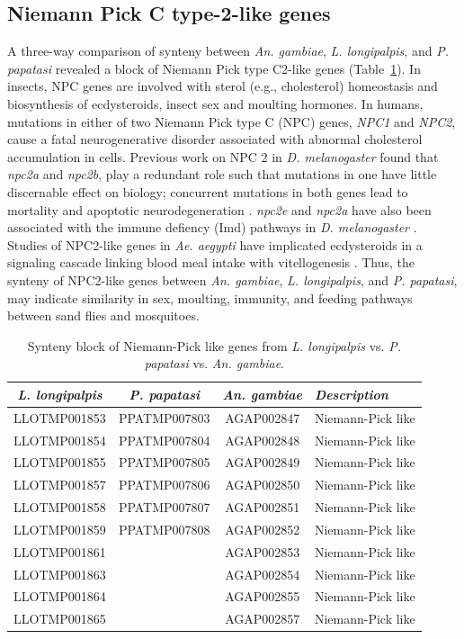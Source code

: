 \subsection{Niemann Pick C type-2-like genes}
A three-way comparison of synteny between \emph{An. gambiae}, \emph{L. longipalpis}, and \emph{P. papatasi} revealed a block of Niemann Pick type C2-like genes (Table~\ref{tab:synteny-three-way-npc2}). In insects, NPC genes are involved with sterol (e.g., cholesterol) homeostasis and biosynthesis of ecdysteroids, insect sex and moulting hormones. In humans, mutations in either of two Niemann Pick type C (NPC) genes, \emph{NPC1} and \emph{NPC2}, cause a fatal neurogenerative disorder associated with abnormal cholesterol accumulation in cells.  Previous work on NPC 2 in \emph{D. melanogaster} found that \emph{npc2a} and \emph{npc2b}, play a redundant role such that mutations in one have little discernable effect on biology; concurrent mutations in both genes lead to mortality and apoptotic neurodegeneration \cite{Huang2007}.  \emph{npc2e} and \emph{npc2a} have also been associated with the immune defiency (Imd) pathways in \emph{D. melanogaster} \cite{Shi2012}. Studies of NPC2-like genes in \emph{Ae. aegypti} have implicated ecdysteroids in a signaling cascade linking blood meal intake with vitellogenesis \cite{Sirot2011}.  Thus, the synteny of NPC2-like genes between \emph{An. gambiae}, \emph{L. longipalpis}, and \emph{P. papatasi}, may indicate similarity in sex, moulting, immunity, and feeding pathways between sand flies and mosquitoes.

\begin{table}[H]
  \centering
  \begin{tabular}{c c c l} \hline
    \emph{L. longipalpis} & \emph{P. papatasi} & \emph{An. gambiae} & \emph{Description} \\ \hline
    LLOTMP001853 & PPATMP007803 & AGAP002847 & Niemann-Pick like \\
    LLOTMP001854 & PPATMP007804 & AGAP002848 & Niemann-Pick like \\
    LLOTMP001855 & PPATMP007805 & AGAP002849 & Niemann-Pick like \\
    LLOTMP001857 & PPATMP007806 & AGAP002850 & Niemann-Pick like \\
    LLOTMP001858 & PPATMP007807 & AGAP002851 & Niemann-Pick like \\
    LLOTMP001859 & PPATMP007808 & AGAP002852 & Niemann-Pick like \\
    LLOTMP001861 & & AGAP002853 & Niemann-Pick like \\
    LLOTMP001863 & & AGAP002854 & Niemann-Pick like \\
    LLOTMP001864 & & AGAP002855 & Niemann-Pick like \\
    LLOTMP001865 & & AGAP002857 & Niemann-Pick like
    \end{tabular}
    \caption{Synteny block of Niemann-Pick like genes from \emph{L. longipalpis} vs. \emph{P. papatasi} vs. \emph{An. gambiae}.}
  \label{tab:synteny-three-way-npc2}
\end{table}

